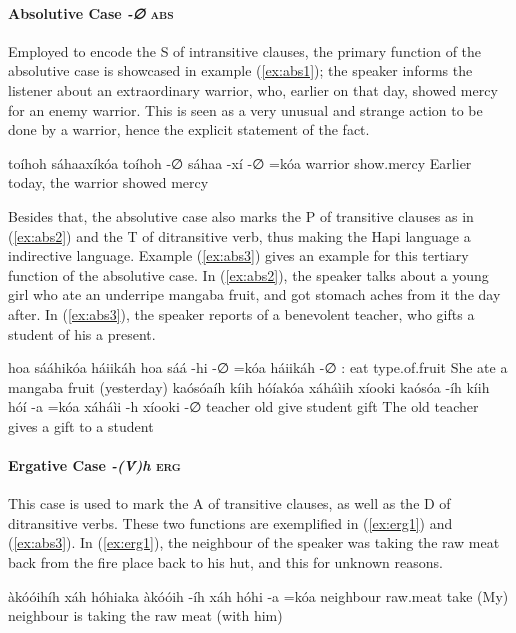 \documentclass[a4paper, 12pt, oneside]{memoir}
\newcommand{\emh}[1]{\textit{#1}}
\begin{document}
\paragraph{Absolutive Case \emh{-∅} \textsc{abs}}
Employed to encode the S of intransitive clauses, the primary function of the absolutive case is showcased in example (\ref{ex:abs1}); the speaker informs the listener about an extraordinary warrior, who, earlier on that day, showed mercy for an enemy warrior. This is seen as a very unusual and strange action to be done by a warrior, hence the explicit statement of the fact. 
\begin{examples}
\ex \label{ex:abs1}
\words toíhoh sáhaaxíkóa
\bits toíhoh -∅ sáhaa -xí -∅ =kóa 
\gloss warrior {\Abs} show.mercy {\Rpasto} {\St}  {\Decl} 
\tr Earlier today, the warrior showed mercy
\end{examples}
Besides that, the absolutive case also marks the P of transitive clauses as in (\ref{ex:abs2}) and the T of ditransitive verb, thus making the Hapi language a indirective language. Example (\ref{ex:abs3}) gives an example for this tertiary function of the absolutive case.
In (\ref{ex:abs2}), the speaker talks about a young girl who ate an underripe mangaba fruit, and got stomach aches from it the day after. In (\ref{ex:abs3}), the speaker reports of a benevolent teacher, who gifts a student of his a present.
\begin{examples}
\ex \label{ex:abs2}
\words hoa sááhikóa háiikáh
\bits hoa sáá -hi -∅ =kóa háiikáh -∅ 
\gloss {\Tsf}:{\Agent} eat {\Rpastt} {\St} {\Decl} type.of.fruit {\Abs}
\tr She ate a mangaba fruit (yesterday)
\ex \label{ex:abs3}
\words kaósóaíh kíih hóíakóa xáháìih xíooki
\bits kaósóa -íh kíih hóí -a =kóa xáháìi -h xíooki -∅
\gloss teacher {\Erg} old give {\St} {\Decl} student {\Dat} gift {\Abs}
\tr The old teacher gives a gift to a student
\end{examples}
\paragraph{Ergative Case \emh{-(V́)h} \textsc{erg}}
This case is used to mark the A of transitive clauses, as well as the D of ditransitive verbs. These two functions are exemplified in (\ref{ex:erg1}) and (\ref{ex:abs3}).
In (\ref{ex:erg1}), the neighbour of the speaker was taking the raw meat back from the fire place back to his hut, and this for unknown reasons.
\begin{examples}
\ex \label{ex:erg1}
\words àkóóihíh xáh hóhiaka
\bits àkóóih -íh xáh hóhi -a =kóa 
\gloss  neighbour {\Erg} raw.meat take {\St} {\Decl} 
\tr (My) neighbour is taking the raw meat (with him)
\end{examples}
\end{document}
